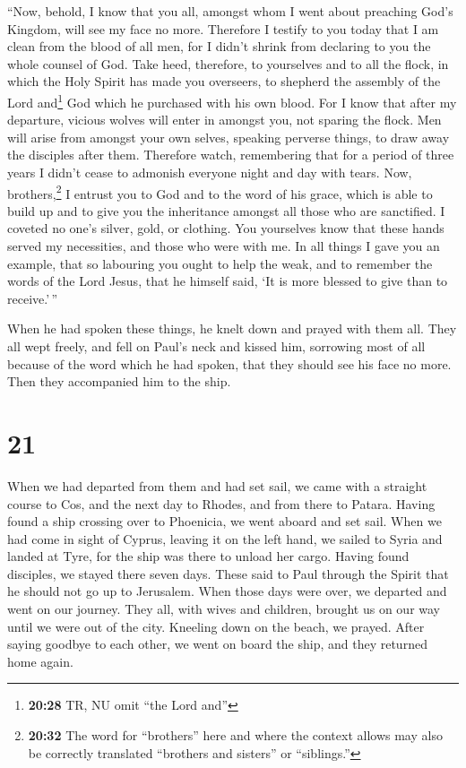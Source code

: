  ``Now, behold, I know that you all, amongst whom I went
about preaching God's Kingdom, will see my face no more. 
Therefore I testify to you today that I am clean from the blood of all
men,  for I didn't shrink from declaring to you the whole
counsel of God.  Take heed, therefore, to yourselves and
to all the flock, in which the Holy Spirit has made you overseers, to
shepherd the assembly of the Lord and\footnote{\textbf{20:28} TR, NU
  omit ``the Lord and''} God which he purchased with his own blood.
 For I know that after my departure, vicious wolves will
enter in amongst you, not sparing the flock.  Men will
arise from amongst your own selves, speaking perverse things, to draw
away the disciples after them.  Therefore watch,
remembering that for a period of three years I didn't cease to admonish
everyone night and day with tears.  Now,
brothers,\footnote{\textbf{20:32} The word for ``brothers'' here and
  where the context allows may also be correctly translated ``brothers
  and sisters'' or ``siblings.''} I entrust you to God and to the word
of his grace, which is able to build up and to give you the inheritance
amongst all those who are sanctified.  I coveted no one's
silver, gold, or clothing.  You yourselves know that
these hands served my necessities, and those who were with me.
 In all things I gave you an example, that so labouring
you ought to help the weak, and to remember the words of the Lord Jesus,
that he himself said, `It is more blessed to give than to receive.'\,''

 When he had spoken these things, he knelt down and
prayed with them all.  They all wept freely, and fell on
Paul's neck and kissed him,  sorrowing most of all
because of the word which he had spoken, that they should see his face
no more. Then they accompanied him to the ship.

\hypertarget{section-20}{%
\section{21}\label{section-20}}

 When we had departed from them and had set sail, we came
with a straight course to Cos, and the next day to Rhodes, and from
there to Patara.  Having found a ship crossing over to
Phoenicia, we went aboard and set sail.  When we had come
in sight of Cyprus, leaving it on the left hand, we sailed to Syria and
landed at Tyre, for the ship was there to unload her cargo.
 Having found disciples, we stayed there seven days. These
said to Paul through the Spirit that he should not go up to Jerusalem.
 When those days were over, we departed and went on our
journey. They all, with wives and children, brought us on our way until
we were out of the city. Kneeling down on the beach, we prayed.
 After saying goodbye to each other, we went on board the
ship, and they returned home again.

